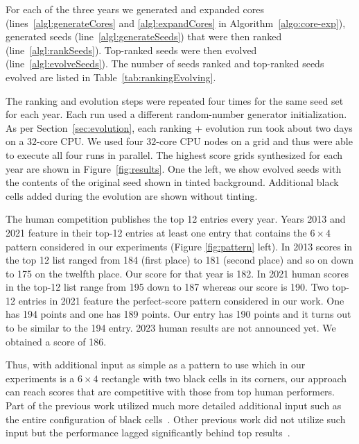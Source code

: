 For each of the three years we generated and expanded cores (lines~\ref{algl:generateCores} and \ref{algl:expandCores} in Algorithm~\ref{algo:core-exp}), generated seeds (line~\ref{algl:generateSeeds}) that were then ranked (line~\ref{algl:rankSeeds}). Top-ranked seeds were then evolved (line~\ref{algl:evolveSeeds}). The number of seeds ranked and top-ranked seeds evolved are listed in Table~\ref{tab:rankingEvolving}.


The ranking and evolution steps were repeated four times for the same seed set for each year. Each run used a different random-number generator initialization. As per Section~\ref{sec:evolution}, each ranking + evolution run took about two days on a $32$-core CPU. We used four $32$-core CPU nodes on a grid and thus were able to execute all four runs in parallel. The highest score grids synthesized for each year are shown in Figure~\ref{fig:results}. One the left, we show evolved seeds with the contents of the original seed shown in tinted background. Additional black cells added during the evolution are shown without tinting.

The human competition publishes the top 12 entries every year.
Years 2013 and 2021 feature in their top-12 entries at least one entry that contains the $6 \times 4$ pattern
considered in our experiments (Figure \ref{fig:pattern} left).
In 2013 scores in the top 12 list ranged from 184 (first place) to 181 (second place) and so on down to 175 on the twelfth place. 
Our score for that year is 182.
In 2021 human scores in the top-12 list range from 195 down to 187 whereas our score is 190.
Two top-12 entries in 2021 feature the perfect-score pattern considered in our work.
One has 194 points and one has 189 points. Our entry has 190 points and it turns out to be similar to the 194 entry. 
2023 human results are not announced yet. We obtained a score of 186.

Thus, with additional input as simple as a pattern to use which 
in our experiments
is a $6 \times 4$ rectangle with two black cells in its corners,
our approach can reach scores that are competitive with those from top human performers.
Part of the previous work utilized much more detailed additional input such as the entire configuration of black cells~\cite{DBLP:conf/socs/BoteaB21}.
Other previous work did not utilize such input but the performance lagged significantly behind
top results~\cite{DBLP:conf/cig/BulitkoB21}.




